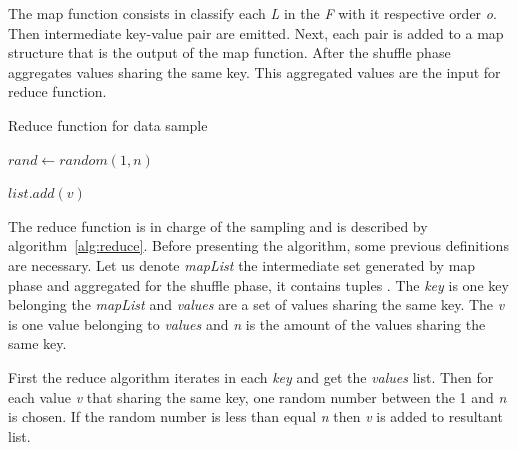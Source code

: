 The map function consists in classify each {\it L} in the {\it F} with
it respective order {\it o}. Then intermediate key-value pair 
are emitted. Next, each pair is added to a map structure that is the output of
the map function. After the shuffle phase aggregates values sharing the same key.
This aggregated values are the input for reduce function.

\begin{algorithm}
		\caption{Reduce function for data sample \label{alg:reduce}}


		 {

			 {
				$rand \leftarrow random(1, n)$

				 {
					$list.add(v)$
				}

			}

		}

\end{algorithm}

The reduce function is in charge of the sampling and is described by algorithm~\ref{alg:reduce}.
Before presenting the algorithm, some previous definitions are necessary. Let us
denote {\it mapList} the intermediate set generated by map phase and aggregated
for the shuffle phase, it contains tuples . The {\it key}
is one key belonging the {\it mapList} and {\it values} are a set of values sharing
the same key. The {\it v} is one value belonging to {\it values} and {\it n} is
the amount of the values sharing the same key.

First the reduce algorithm iterates in each {\it key} and get the {\it values}
list. Then for each value {\it v} that sharing the same key, one random number
between the 1 and {\it n} is chosen. If the random number is less than equal
{\it n} then {\it v} is added to resultant list. 
